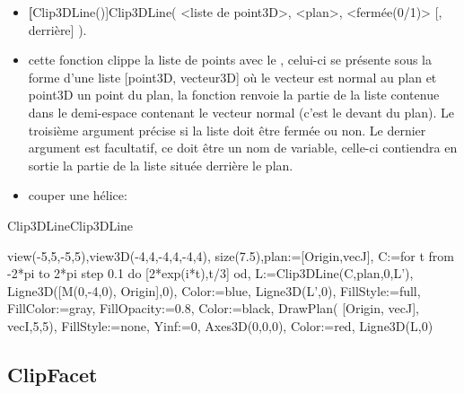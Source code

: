 \begin{itemize}
 \item \util \textbf[Clip3DLine()]{Clip3DLine( <liste de point3D>, <plan>, <fermée(0/1)> [, derrière] )}.
 \item \desc cette fonction clippe la liste de points avec le , celui-ci se présente sous la forme d'une liste [point3D, vecteur3D] où le vecteur est normal au plan et point3D un point du plan, la fonction renvoie la partie de la liste contenue dans le demi-espace contenant le vecteur normal (c'est le devant du plan). Le troisième argument précise si la liste doit être fermée ou non. Le dernier argument est facultatif, ce doit être un nom de variable, celle-ci contiendra en sortie la partie de la liste située derrière le plan. 
 \item \exem couper une hélice:

\end{itemize}


\begin{demo}{Clip3DLine}{Clip3DLine}
\begin{texgraph}[name=Clip3DLine]
 view(-5,5,-5,5),view3D(-4,4,-4,4,-4,4),
 size(7.5),plan:=[Origin,vecJ],
 C:=for t from -2*pi to 2*pi step 0.1 do
  [2*exp(i*t),t/3] od,
 L:=Clip3DLine(C,plan,0,L'),
 Ligne3D([M(0,-4,0), Origin],0),
 Color:=blue, Ligne3D(L',0),
 FillStyle:=full, FillColor:=gray,
 FillOpacity:=0.8, Color:=black,
 DrawPlan( [Origin, vecJ], vecI,5,5),
 FillStyle:=none,
 Yinf:=0, Axes3D(0,0,0),
 Color:=red, Ligne3D(L,0)
\end{texgraph}
\end{demo}


\subsection{ClipFacet}\label{cmdClipFacet}

